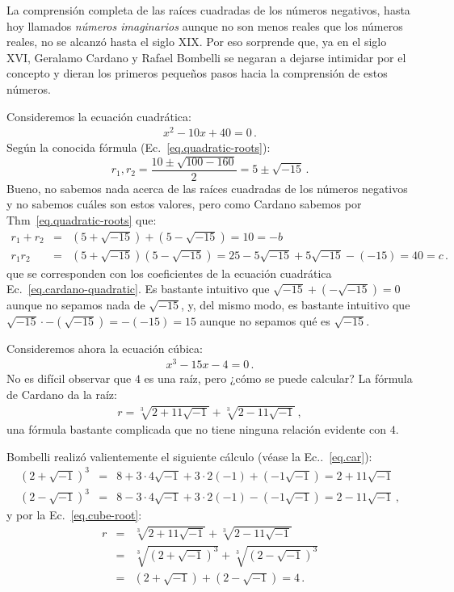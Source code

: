 La comprensión completa de las raíces cuadradas de los números negativos, hasta hoy llamados \emph{números imaginarios} aunque no son menos reales que los números reales, no se alcanzó hasta el siglo XIX. Por eso sorprende que, ya en el siglo XVI, Geralamo Cardano y Rafael Bombelli se negaran a dejarse intimidar por el concepto y dieran los primeros pequeños pasos hacia la comprensión de estos números.

Consideremos la ecuación cuadrática:
\begin{align}
x^2-10x+40=0\,.\label{eq.cardano-quadratic}
\end{align}
Según la conocida fórmula (Ec.~\ref{eq.quadratic-roots}):
\[
r_1, r_2=\displaystyle\frac{10\pm\sqrt{100-160}}{2}=5\pm\sqrt{-15}\,.
\]
Bueno, no sabemos nada acerca de las raíces cuadradas de los números negativos y no sabemos cuáles son estos valores, pero como Cardano sabemos por Thm~\ref{eq.quadratic-roots} que:
\[
\begin{array}{lcl}
r_1+r_2&=&(5+\sqrt{-15})+(5-\sqrt{-15})=10=-b\\
r_1r_2&=&(5+\sqrt{-15})(5-\sqrt{-15})=25-5\sqrt{-15}+5\sqrt{-15}-(-15)=40=c\,.
\end{array}
\]
que se corresponden con los coeficientes de la ecuación cuadrática Ec.~\ref{eq.cardano-quadratic}. Es bastante intuitivo que $\sqrt{-15}+(-\sqrt{-15})=0$ aunque no sepamos nada de $\sqrt{-15}$, y, del mismo modo, es bastante intuitivo que $\sqrt{-15}\cdot-(\sqrt{-15})=-(-15)=15$ aunque no sepamos qué es $\sqrt{-15}$.

Consideremos ahora la ecuación cúbica:
\begin{align}
x^3-15x-4=0\,.\label{eq.bombelli-cubic}
\end{align}
No es difícil observar que $4$ es una raíz, pero ¿cómo se puede calcular? La fórmula de Cardano da la raíz:
\begin{align}
r=\sqrt[3]{2+11\sqrt{-1}}+\sqrt[3]{2-11\sqrt{-1}}\,,\label{eq.cube-root}
\end{align}
una fórmula bastante complicada que no tiene ninguna relación evidente con $4$. 

Bombelli realizó valientemente el siguiente cálculo (véase la Ec..~\ref{eq.car}):
\begin{eqnarray*}
(2+\sqrt{-1})^3&=&
8+3\cdot 4\sqrt{-1}+3\cdot 2(-1)+(-1\sqrt{-1})=
2+11\sqrt{-1}\\
(2-\sqrt{-1})^3&=&
8-3\cdot 4\sqrt{-1}+3\cdot 2(-1)-(-1\sqrt{-1})=
2-11\sqrt{-1}\,,
\end{eqnarray*}
y por la Ec.~\ref{eq.cube-root}:
\begin{eqnarray*}
r&=&\sqrt[3]{2+11\sqrt{-1}} + \sqrt[3]{2-11\sqrt{-1}}\\
&=&\sqrt[3]{(2+\sqrt{-1})^3} + \sqrt[3]{(2-\sqrt{-1})^3}\\
&=&(2+\sqrt{-1}) + (2-\sqrt{-1})=4\,.
\end{eqnarray*}

